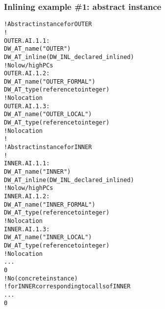\subsubsection{Inlining example \#1: abstract instance}
\label{app:inliningexample1abstractinstance}
\begin{alltt}
    ! Abstract instance for OUTER
    !
OUTER.AI.1.1:
        DW\_AT\_name("OUTER")
        DW\_AT\_inline(DW\_INL\_declared\_inlined)
        ! No low/high PCs
OUTER.AI.1.2:
            DW\_AT\_name("OUTER\_FORMAL")
            DW\_AT\_type(reference to integer)
            ! No location
OUTER.AI.1.3:
            DW\_AT\_name("OUTER\_LOCAL")
            DW\_AT\_type(reference to integer)
            ! No location
        !
        ! Abstract instance for INNER
        !
INNER.AI.1.1:
            DW\_AT\_name("INNER")
            DW\_AT\_inline(DW\_INL\_declared\_inlined)
            ! No low/high PCs
INNER.AI.1.2:
                DW\_AT\_name("INNER\_FORMAL")
                DW\_AT\_type(reference to integer)
                ! No location
INNER.AI.1.3:
                DW\_AT\_name("INNER\_LOCAL")
                DW\_AT\_type(reference to integer)
                ! No location
            ...
            0
        ! No  (concrete instance)
        ! for INNER corresponding to calls of INNER
        ...
        0
\end{alltt}


